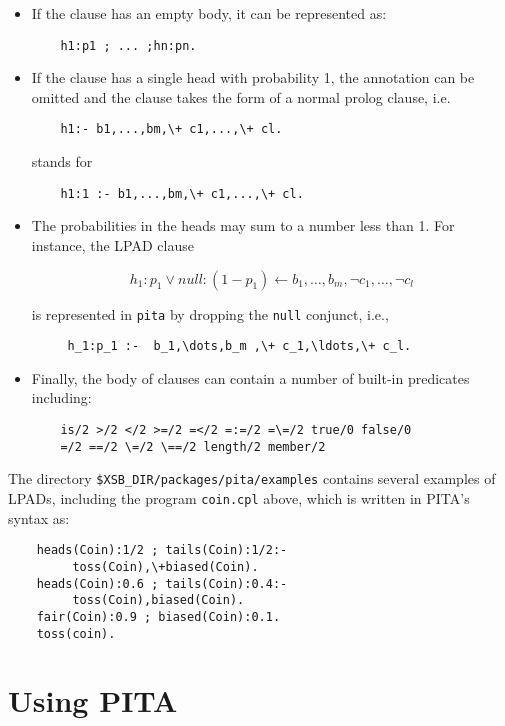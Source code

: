 \begin{itemize}
\item If the clause has an empty body, it can be represented as:
\begin{verbatim}
    h1:p1 ; ... ;hn:pn.
\end{verbatim}
\item If the clause has a single head with probability 1, the annotation can be omitted and the clause takes the form of a normal prolog clause, i.e. 
\begin{verbatim}
    h1:- b1,...,bm,\+ c1,...,\+ cl.
\end{verbatim}
stands for 
\begin{verbatim}
    h1:1 :- b1,...,bm,\+ c1,...,\+ cl.
\end{verbatim}

\item The probabilities in the heads may sum to a number less than 1.
  For instance, the LPAD clause 

\[h_1:p_1\vee null:(1-p_1)\leftarrow b_1,\dots,b_m ,\neg c_1,\ldots,\neg c_l\]

is represented in {\tt pita} by dropping the {\tt null} conjunct, i.e., 

\begin{verbatim}
     h_1:p_1 :-  b_1,\dots,b_m ,\+ c_1,\ldots,\+ c_l.
\end{verbatim}

\item Finally, the body of clauses can contain a number of built-in predicates including:
\begin{verbatim}
    is/2 >/2 </2 >=/2 =</2 =:=/2 =\=/2 true/0 false/0
    =/2 ==/2 \=/2 \==/2 length/2 member/2
\end{verbatim}
\end{itemize}

The directory {\tt \$XSB\_DIR/packages/pita/examples} contains several
examples of LPADs, including the program \texttt{coin.cpl} above,
which is written in PITA's syntax as:

\begin{verbatim}
    heads(Coin):1/2 ; tails(Coin):1/2:- 
         toss(Coin),\+biased(Coin).
    heads(Coin):0.6 ; tails(Coin):0.4:- 
         toss(Coin),biased(Coin).
    fair(Coin):0.9 ; biased(Coin):0.1.
    toss(coin).
\end{verbatim}

\section{Using PITA}
